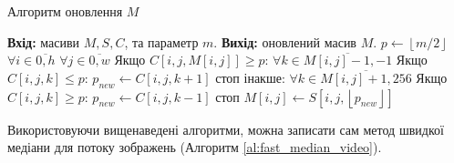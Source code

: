\begin{algorithm}[H]
    \caption{Алгоритм оновлення $M$}
    \begin{algorithmic}
        \State \textbf{Вхід:} масиви $M, S, C$, та параметр $m$.
        \State \textbf{Вихід:} оновлений масив $M$.
        \State $p \gets \left\lfloor m/2 \right\rfloor$ 
        \State $\forall i \in \overline{0,h}$
        \State \qquad  $\forall j \in \overline{0,w}$
        \State \qquad \qquad  Якщо $C[i,j, M[i,j]] \geq p$:
        \State \qquad \qquad \qquad $\forall k \in \overline{M[i,j]-1,-1}$
        \State \qquad \qquad \qquad \qquad  Якщо $C[i,j,k] \leq p$:
        \State \qquad \qquad \qquad \qquad \qquad $p_{new} \gets C[i,j,k+1]$
        \State \qquad \qquad \qquad \qquad \qquad стоп
        \State \qquad \qquad інакше:
        \State \qquad \qquad \qquad $\forall k \in \overline{M[i,j]+1,256}$
        \State \qquad \qquad \qquad \qquad  Якщо $C[i,j,k] \geq p$:
        \State \qquad \qquad \qquad \qquad \qquad $p_{new} \gets C[i,j,k-1]$
        \State \qquad \qquad \qquad \qquad \qquad стоп
        \State \qquad \qquad $M[i,j] \gets S[i,j, \left\lfloor p_{new}\right\rfloor ]$
    \end{algorithmic}
    \label{al:update_M}
\end{algorithm}

Використовуючи вищенаведені алгоритми,
можна записати сам метод швидкої медіани для потоку зображень (Алгоритм \ref{al:fast_median_video}).


